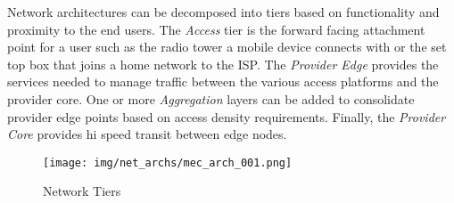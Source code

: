 Network architectures can be decomposed into tiers based on functionality and proximity to the end users. The \textit{Access} tier is the forward facing attachment point for a user such as the radio tower a mobile device connects with or the set top box that joins a home network to the ISP. The \textit{Provider Edge } provides the services needed to manage traffic between the various access platforms and the provider core. One or more \textit{Aggregation} layers can be added to consolidate provider edge points based on access density requirements. Finally, the \textit{Provider Core} provides hi speed transit between edge nodes. 

\begin{figure}[H]
\centering
\texttt{[image: img/net\_archs/mec\_arch\_001.png]}
\caption{ Network Tiers}
\label{fig:mec_edge}
\end{figure} 